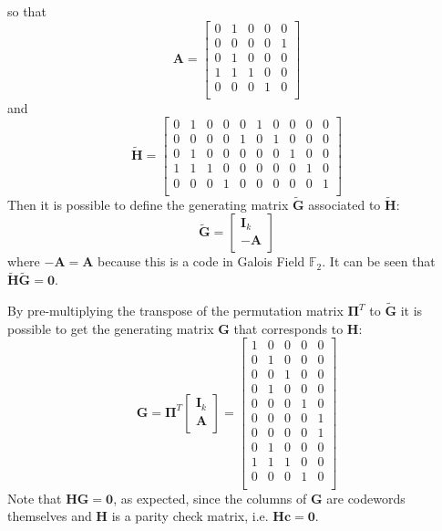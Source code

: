 \documentclass[10pt]{article}
\begin{document}
so that 
\begin{equation}
	\mathbf{A} = 
	\begin{bmatrix}
		0&1&0&0&0\\0&0&0&0&1\\0&1&0&0&0\\1&1&1&0&0\\0&0&0&1&0\\
	\end{bmatrix}
\end{equation}
and 
\begin{equation}
	\mathbf{\tilde{H}} = 
	\begin{bmatrix}

		0&1&0&0&0&1&0&0&0&0\\0&0&0&0&1&0&1&0&0&0\\0&1&0&0&0&0&0&1&0&0\\1&1&1&0&0&0&0&0&1&0\\0&0&0&1&0&0&0&0&0&1\\
	\end{bmatrix}
\end{equation}
Then it is possible to define the generating matrix $\mathbf{\tilde{G}}$ associated to $\mathbf{\tilde{H}}$:
\begin{equation}
	\mathbf{\tilde{G}} = 
	\begin{bmatrix}
		\mathbf{I}_k \\
		- \mathbf{A} \\
	\end{bmatrix}
\end{equation}
where $-\mathbf{A} = \mathbf{A}$ because this is a code in Galois Field $\mathbb{F}_2$. It can be seen that $\mathbf{\tilde{H}}\mathbf{\tilde{G}} = \mathbf{0}$.

By pre-multiplying the transpose of the permutation matrix $\mathbf{\Pi}^T$ to $\mathbf{\tilde{G}}$ it is possible to get the generating matrix $\mathbf{G}$ that corresponds to $\mathbf{H}$:
\begin{equation}
	\mathbf{G} = 
	\mathbf{\Pi}^T
	\begin{bmatrix}
		\mathbf{I}_k \\
		\mathbf{A} \\
	\end{bmatrix} = 
	\begin{bmatrix}
		1&0&0&0&0\\
		0&1&0&0&0\\
		0&0&1&0&0\\
		0&1&0&0&0\\
		0&0&0&1&0\\
		0&0&0&0&1\\
		0&0&0&0&1\\
		0&1&0&0&0\\
		1&1&1&0&0\\
		0&0&0&1&0\\
	\end{bmatrix}
\end{equation}
Note that $\mathbf{H}\mathbf{G} = \mathbf{0}$, as expected, since the columns of $\mathbf{G}$ are codewords themselves and $\mathbf{H}$ is a parity check matrix, i.e. $\mathbf{H}\mathbf{c} = \mathbf{0}$.
\end{document}
